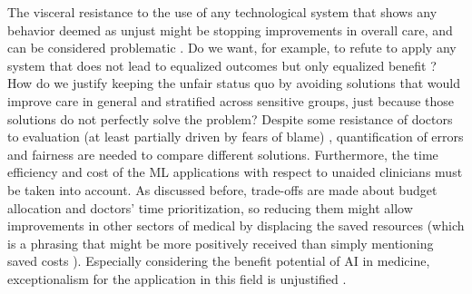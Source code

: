     The visceral resistance to the use of any technological system that shows any behavior deemed as unjust might be stopping improvements in overall care, and can be considered problematic \cite{[Citation?]}.
    Do we want, for example, to refute to apply any system that does not lead to equalized outcomes but only equalized benefit \cite[p.~5]{Rajkomar2018}?
    How do we justify keeping the unfair status quo by avoiding solutions that would improve care in general and stratified across sensitive groups, just because those solutions do not perfectly solve the problem?
    Despite some resistance of doctors to evaluation (at least partially driven by fears of blame) \cite{Waring2005}, quantification of errors and fairness are needed to compare different solutions.
    Furthermore, the time efficiency and cost of the ML applications with respect to unaided clinicians must be taken into account.
    As discussed before, trade-offs are made about budget allocation and doctors' time prioritization, so reducing them might allow improvements in other sectors of medical by displacing the saved resources (which is a phrasing that might be more positively received than simply mentioning saved costs \cite{Tetlock2003}).
    Especially considering the benefit potential of AI in medicine, exceptionalism for the application in this field is unjustified \cite[p.~9]{Fletcher2021}.

